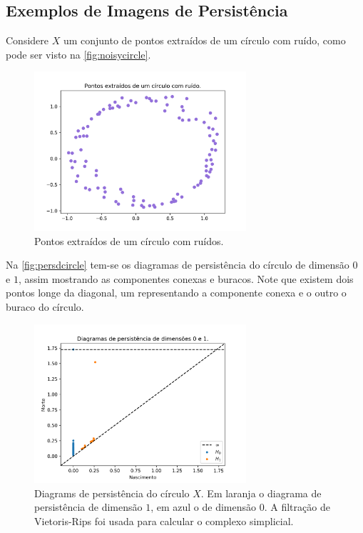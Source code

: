 \subsection{Exemplos de Imagens de Persistência}
Considere $X$ um conjunto de pontos extraídos de um círculo com ruído, como pode ser visto na 
\autoref{fig:noisycircle}.
\begin{figure}[!htbp]
    \centering
    \includegraphics[width=0.7\textwidth]{images/noisy_circle.png}
    \caption{Pontos extraídos de um círculo com ruídos.}
    \fautor
    \label{fig:noisycircle}
\end{figure}
Na \autoref{fig:persdcircle} tem-se os diagramas de persistência do círculo de dimensão $0$ e $1$, assim mostrando
as componentes conexas e buracos. Note que existem dois pontos longe da diagonal, um representando a 
componente conexa e o outro o buraco do círculo.  
\begin{figure}[!htbp]
    \centering
    \includegraphics[width=0.7\textwidth]{images/persdcircle.png}
    \caption{Diagrams de persistência do círculo $X$. Em laranja o diagrama de persistência de dimensão $1$,  
            em azul o de dimensão $0$. A filtração de Vietoris-Rips foi usada para calcular o complexo simplicial.}
    \fautor
    \label{fig:persdcircle}
\end{figure}
